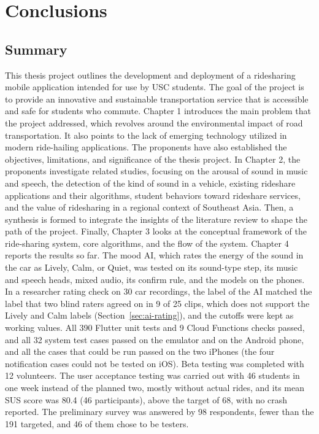 \chapter{Conclusions}

\section{Summary}
This thesis project outlines the development and deployment of a ridesharing mobile application intended for use by USC students. The goal of the project is to provide an innovative and sustainable transportation service that is accessible and safe for students who commute. Chapter 1 introduces the main problem that the project addressed, which revolves around the environmental impact of road transportation. It also points to the lack of emerging technology utilized in modern ride-hailing applications. The proponents have also established the objectives, limitations, and significance of the thesis project. In Chapter 2, the proponents investigate related studies, focusing on the arousal of sound in music and speech, the detection of the kind of sound in a vehicle, existing rideshare applications and their algorithms, student behaviors toward rideshare services, and the value of ridesharing in a regional context of Southeast Asia. Then, a synthesis is formed to integrate the insights of the literature review to shape the path of the project. Finally, Chapter 3 looks at the conceptual framework of the ride-sharing system, core algorithms, and the flow of the system. Chapter 4 reports the results so far. The mood AI, which rates the energy of the sound in the car as Lively, Calm, or Quiet, was tested on its sound-type step, its music and speech heads, mixed audio, its confirm rule, and the models on the phones. In a researcher rating check on 30 car recordings, the label of the AI matched the label that two blind raters agreed on in 9 of 25 clips, which does not support the Lively and Calm labels (Section~\ref{sec:ai-rating}), and the cutoffs were kept as working values. All 390 Flutter unit tests and 9 Cloud Functions checks passed, and all 32 system test cases passed on the emulator and on the Android phone, and all the cases that could be run passed on the two iPhones (the four notification cases could not be tested on iOS). Beta testing was completed with 12 volunteers. The user acceptance testing was carried out with 46 students in one week instead of the planned two, mostly without actual rides, and its mean SUS score was 80.4 (46 participants), above the target of 68, with no crash reported. The preliminary survey was answered by 98 respondents, fewer than the 191 targeted, and 46 of them chose to be testers. 


